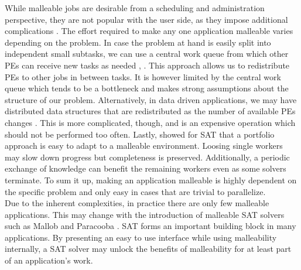 While malleable jobs are desirable from a scheduling and administration perspective, they are not popular with the user side, as they impose additional complications \cite{feitelson1997job}. The effort required to make any one application malleable varies depending on the problem. In case the problem at hand is easily split into independent small subtasks, we can use a central work queue from which other PEs can receive new tasks as needed \cite{feitelson1997job}, \cite{tucker1989process}. This approach allows us to redistribute PEs to other jobs in between tasks. It is however limited by the central work queue which tends to be a bottleneck and makes strong assumptions about the structure of our problem. Alternatively, in data driven applications, we may have distributed data structures that are redistributed as the number of available PEs changes \cite{feitelson1997job}. This is more complicated, though, and is an expensive operation which should not be performed too often. Lastly, \cite{schreiber2021scalable} showed for SAT that a portfolio approach is easy to adapt to a malleable environment. Loosing single workers may slow down progress but completeness is preserved. Additionally, a periodic exchange of knowledge can benefit the remaining workers even as some solvers terminate. To sum it up, making an application malleable is highly dependent on the specific problem and only easy in cases that are trivial to parallelize. \\
Due to the inherent complexities, in practice there are only few malleable applications. This may change with the introduction of malleable SAT solvers such as Mallob \cite{schreiber2021scalable} and Paracooba \cite{heisinger2020distributed}. SAT forms an important building block in many applications. By presenting an easy to use interface while using malleability internally, a SAT solver may unlock the benefits of malleability for at least part of an application's work.

